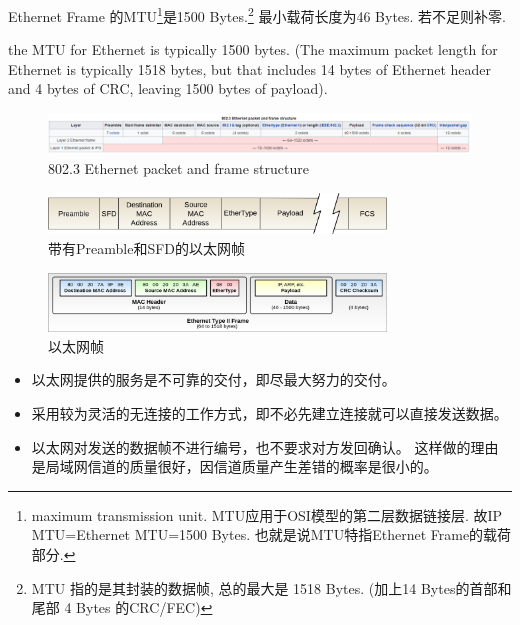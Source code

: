 \documentclass[a4paper]{report}
\begin{document}

Ethernet Frame 的MTU\footnote{maximum transmission unit. MTU应用于OSI模型的第二层数据链接层. 故IP MTU=Ethernet MTU=1500 Bytes. 也就是说MTU特指Ethernet Frame的载荷部分. }是1500 Bytes.\footnote{MTU 指的是其封装的数据帧, 总的最大是 1518 Bytes. (加上14 Bytes的首部和尾部 4 Bytes 的CRC/FEC) } 最小载荷长度为46 Bytes. 若不足则补零. 

the MTU for Ethernet is typically 1500 bytes. (The maximum packet length for Ethernet is typically 1518 bytes, but that includes 14 bytes of Ethernet header and 4 bytes of CRC, leaving 1500 bytes of payload).

\begin{figure}[H]
\centering
\includegraphics[width=\textwidth]{ethernet_frame_3.png}
\caption{802.3 Ethernet packet and frame structure}
\end{figure}

\begin{figure}[H]
\centering
\includegraphics[width=0.8\textwidth]{ethernet_frame_2.png}
\caption{带有Preamble和SFD的以太网帧}
\end{figure}

\begin{figure}[H]
\centering
\includegraphics[width=0.8\textwidth]{ethernet_frame.png}
\caption{以太网帧}
\end{figure}



\begin{itemize}
  \item 以太网提供的服务是不可靠的交付，即尽最大努力的交付。
  \item 采用较为灵活的无连接的工作方式，即不必先建立连接就可以直接发送数据。 
  \item 以太网对发送的数据帧不进行编号，也不要求对方发回确认。
  \subitem 这样做的理由是局域网信道的质量很好，因信道质量产生差错的概率是很小的。 
\end{itemize}
\end{document}
